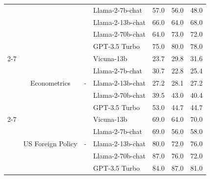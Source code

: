 \begin{longtable} {@{}ccclccc@{}}
&                         &                         &Llama-2-7b-chat & 57.0 & 56.0 & 48.0\\
&                         &                         &Llama-2-13b-chat & 66.0 & 64.0 & 68.0\\
&                         &                         &Llama-2-70b-chat & 64.0 & 73.0 & 72.0\\
&                         &                         &GPT-3.5 Turbo & 75.0 & 80.0 & 78.0\\ \cmidrule(l){2-7}
                         & \multirow{5}{*}{Econometrics}     & \multirow{5}{*}{-}   & Vicuna-13b & 23.7 & 29.8 & 31.6\\
&                         &                         &Llama-2-7b-chat & 30.7 & 22.8 & 25.4\\
&                         &                         &Llama-2-13b-chat & 27.2 & 28.1 & 27.2\\
&                         &                         &Llama-2-70b-chat & 39.5 & 43.0 & 40.4\\
&                         &                         &GPT-3.5 Turbo & 53.0 & 44.7 & 44.7\\ \cmidrule(l){2-7}
                         & \multirow{5}{*}{US Foreign Policy}     & \multirow{5}{*}{-}   & Vicuna-13b & 69.0 & 64.0 & 70.0\\
&                         &                         &Llama-2-7b-chat & 69.0 & 56.0 & 58.0\\
&                         &                         &Llama-2-13b-chat & 80.0 & 72.0 & 76.0\\
&                         &                         &Llama-2-70b-chat & 87.0 & 76.0 & 72.0\\
&                         &                         &GPT-3.5 Turbo & 84.0 & 87.0 & 81.0\\ \midrule


\end{longtable}
